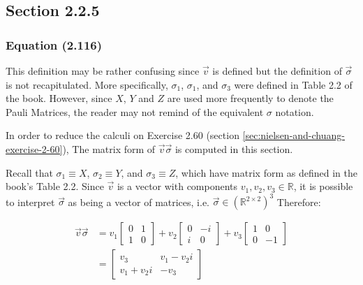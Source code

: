\subsection{Section 2.2.5}
\subsubsection{Equation (2.116)}
\label{sec:nielsen-and-chuang-equation-2-116}

This definition may be rather confusing since $\vec{v}$ is defined
but the definition of $\vec{\sigma}$ is not recapitulated.
More specifically, $\sigma_1$, $\sigma_1$, and $\sigma_3$ were
defined in Table 2.2 of the book.
However, since $X$, $Y$ and $Z$ are used more frequently to
denote the Pauli Matrices, the reader may not remind of the
equivalent $\sigma$ notation.

In order to reduce the calculi on Exercise 2.60
(section \ref{sec:nielsen-and-chuang-exercise-2-60}),
The matrix form of $\vec{v} \vec{\sigma}$ is computed in this section.

Recall that $\sigma_1 \equiv X$, $\sigma_2 \equiv Y$,
and $\sigma_3 \equiv Z$, which have matrix form as defined in
the book's Table 2.2.
Since $\vec{v}$ is a vector with components
$v_1, v_2, v_3 \in \mathbb{R}$,
it is possible to interpret $\vec{\sigma}$ as being a vector of
matrices, i.e. $\vec{\sigma} \in (\mathbb{R}^{2 \times 2})^3$
Therefore:

\begin{align}
    \vec{v} \vec{\sigma} &= v_1 \left[ \begin{matrix}
        0 & 1 \\ 1 & 0 \end{matrix}\right] +
        v_2 \left[ \begin{matrix}
        0 & -i \\ i & 0 \end{matrix} \right] +
        v_3 \left[ \begin{matrix}
        1 & 0 \\ 0 & -1\end{matrix} \right]
        \\
        &= \left[ \begin{matrix}
        v_3 & v_1 -v_2 i \\ v_1 + v_2 i & - v_3
        \end{matrix} \right]
\end{align}

